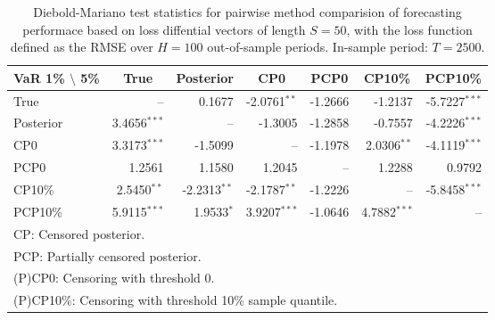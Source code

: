 { \renewcommand{\arraystretch}{1.2} 
\begin{table}[!ht]
\center 
\begin{tabular}{l | rrr rrr} 
VaR 1\% $\setminus$ 5\% & \multicolumn{1}{c}{True} & \multicolumn{1}{c}{Posterior} & \multicolumn{1}{c}{CP0} & \multicolumn{1}{c}{PCP0} & \multicolumn{1}{c}{CP10\%} & \multicolumn{1}{c}{PCP10\%} \\ \hline 
True &    --\phantom{$^{***}$} & 0.1677\phantom{$^{***}$} & -2.0761$^{**}$\phantom{$^{*}$} & -1.2666\phantom{$^{***}$} & -1.2137\phantom{$^{***}$} & -5.7227$^{***}$  \\ 
Posterior & 3.4656$^{***}$ &    --\phantom{$^{***}$} & -1.3005\phantom{$^{***}$} & -1.2858\phantom{$^{***}$} & -0.7557\phantom{$^{***}$} & -4.2226$^{***}$  \\ 
CP0 & 3.3173$^{***}$ & -1.5099\phantom{$^{***}$} &    --\phantom{$^{***}$} & -1.1978\phantom{$^{***}$} & 2.0306$^{**}$\phantom{$^{*}$} & -4.1119$^{***}$  \\ 
PCP0 & 1.2561\phantom{$^{***}$} & 1.1580\phantom{$^{***}$} & 1.2045\phantom{$^{***}$} &    --\phantom{$^{***}$} & 1.2288\phantom{$^{***}$} & 0.9792\phantom{$^{***}$}  \\ 
CP10\% & 2.5450$^{**}$\phantom{$^{*}$} & -2.2313$^{**}$\phantom{$^{*}$} & -2.1787$^{**}$\phantom{$^{*}$} & -1.2226\phantom{$^{***}$} &    --\phantom{$^{***}$} & -5.8458$^{***}$  \\ 
PCP10\% & 5.9115$^{***}$ & 1.9533$^{*}$\phantom{$^{**}$} & 3.9207$^{***}$ & -1.0646\phantom{$^{***}$} & 4.7882$^{***}$ &    --\phantom{$^{***}$}  \\ 
\hline 
\multicolumn{7}{l}{\footnotesize{CP: Censored posterior.}}  \\ 
\multicolumn{7}{l}{\footnotesize{PCP: Partially censored posterior.}} \\ 
\multicolumn{7}{l}{\footnotesize{(P)CP0: Censoring with threshold 0.}} \\ 
\multicolumn{7}{l}{\footnotesize{(P)CP10\%: Censoring with threshold 10\% sample quantile.}}  \\ 
\end{tabular}
 \caption{Diebold-Mariano test statistics for  pairwise method comparision of forecasting performace based on loss diffential vectors of length $S = 50$, with the loss function defined as the RMSE over $H=100$ out-of-sample periods. In-sample period: $T = 2500$.} 
\label{tab:garch11_DM_T_2500}  
\end{table}
}